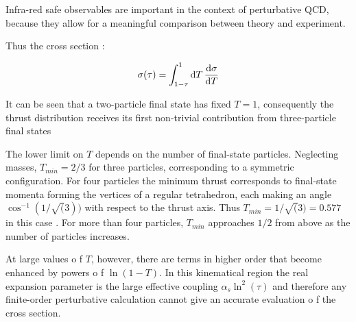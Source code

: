\documentclass[../main.tex]{subfiles}
\begin{document}
Infra-red safe observables are important in the context of perturbative QCD, because they allow for a meaningful comparison between theory and experiment. 

Thus the cross section :

\begin{equation}\label{eq:cross_section}
    \sigma(\tau) = \int^1_{1-\tau} \dd{T} \dv{\sigma}{T}
\end{equation}

It can be seen that a two-particle final state has fixed $T = 1$, consequently the thrust
distribution receives its first non-trivial contribution from three-particle final states

The lower limit on $T$ depends on the number of final-state particles.
Neglecting masses, $T_{min} = 2/3$ for three particles, corresponding to a symmetric
configuration. For four particles the minimum thrust corresponds to final-state
momenta forming the vertices of a regular tetrahedron, each making an angle
$\cos^{-1}(1/\sqrt(3))$ with respect to the thrust axis. Thus $T_{min} = 1/\sqrt(3) = 0.577$ in this
case . For more than four particles, $T_{min}$ approaches $1/2$ from above as the number of particles increases.

At large values o f $T$, however, there are terms in higher order that become enhanced by powers o f $\ln(1 - T)$.
In this kinematical region the real expansion parameter is the
large effective coupling $\alpha_s \ln^2(\tau)$ and therefore
any finite-order perturbative calculation cannot give an accurate evaluation o f the cross section.
\end{document}
